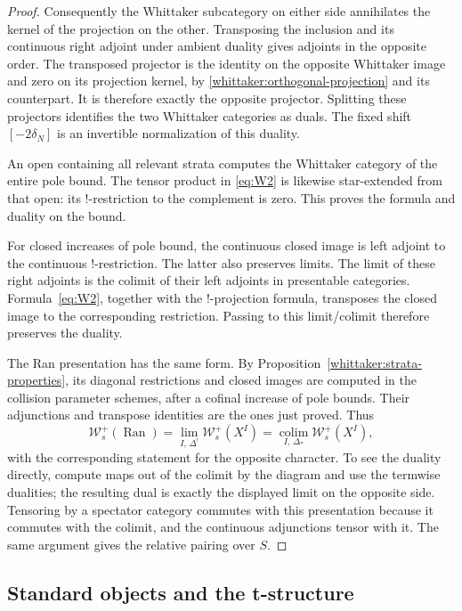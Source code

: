\documentclass[11pt]{article}
\numberwithin{equation}{section}
\theoremstyle{definition}
\theoremstyle{remark}
\begin{document}
\begin{proof}
Consequently the Whittaker subcategory on either side annihilates the
kernel of the projection on the other. Transposing the inclusion and its
continuous right adjoint under ambient duality gives adjoints in the
opposite order. The transposed projector is the identity on the opposite
Whittaker image and zero on its projection kernel, by
\eqref{whittaker:orthogonal-projection} and its counterpart. It is
therefore exactly the opposite projector. Splitting these projectors
identifies the two Whittaker categories as duals. The fixed shift
$[-2\delta_N]$ is an invertible normalization of this duality.

An open containing all relevant strata computes the Whittaker category of
the entire pole bound. The tensor product in \eqref{eq:W2} is likewise
star-extended from that open: its $!$-restriction to the complement is
zero. This proves the formula and duality on the bound.

For closed increases of pole bound, the continuous closed image is left
adjoint to the continuous $!$-restriction. The latter also preserves
limits. The limit of these right adjoints is the colimit of their left
adjoints in presentable categories. Formula~\eqref{eq:W2}, together with
the $!$-projection formula, transposes the closed image to the
corresponding restriction. Passing to this limit/colimit therefore
preserves the duality.

The Ran presentation has the same form. By
Proposition~\ref{whittaker:strata-properties}, its diagonal restrictions
and closed images are computed in the collision parameter schemes, after
a cofinal increase of pole bounds. Their adjunctions and transpose
identities are the ones just proved. Thus
\[
 \mathcal W_s^+(\operatorname{Ran})
   =\lim_{I,\,\Delta^!}\mathcal W_s^+(X^I)
   =\operatorname*{colim}_{I,\,\Delta_*}\mathcal W_s^+(X^I),
\]
with the corresponding statement for the opposite character. To see the
duality directly, compute maps out of the colimit by the diagram and use
the termwise dualities; the resulting dual is exactly the displayed
limit on the opposite side. Tensoring by a spectator category commutes
with this presentation because it commutes with the colimit, and the
continuous adjunctions tensor with it. The same argument gives the
relative pairing over $S$.
\end{proof}

\subsection{Standard objects and the t-structure}
\end{document}
